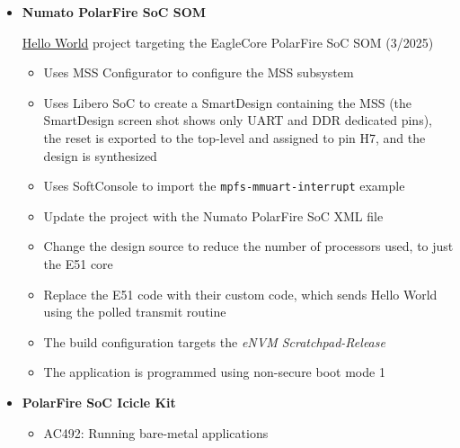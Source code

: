 \begin{itemize}
\begin{itemize}
{Gareth Halfacree - Hands-On with the Low-Cost Microchip PolarFire SoC Discovery Kit}
\begin{itemize}
\item
This article summarizes the Discovery Kit hardware and software features.
\item
Gareth has another series of articles on the
\href{https://www.hackster.io/news/hackster-s-fpgadventures-unboxing-and-testing-the-microchip-polarfire-soc-icicle-kit-9f194a9639f6}
{PolarFire SoC Icicle Kit} (there are links to the whole series at the end of the first article).
\item Starware
\end{itemize}
%
\end{itemize}

\item \textbf{Numato PolarFire SoC SOM}

\href{https://numato.com/kb/hello-world-project-on-eaglecore-polarfire-soc-som}
{Hello World} project targeting the EagleCore PolarFire SoC SOM (3/2025)
%
\begin{itemize}
\item Uses MSS Configurator to configure the MSS subsystem
\item Uses Libero SoC to create a SmartDesign containing the MSS\newline
(the SmartDesign screen shot shows only UART and DDR dedicated pins), the
reset is exported to the top-level and assigned to pin H7, and the
design is synthesized
\item Uses SoftConsole to import the \verb+mpfs-mmuart-interrupt+ example
\item Update the project with the Numato PolarFire SoC XML file
\item Change the design source to reduce the number of processors used, to just the E51 core
\item Replace the E51 code with their custom code, which sends Hello World
using the polled transmit routine
\item The build configuration targets the \emph{eNVM Scratchpad-Release}
\item The application is programmed using non-secure boot mode 1
\end{itemize}

\newpage
\item \textbf{PolarFire SoC Icicle Kit}
%
\begin{itemize}
%
\item AC492: Running bare-metal applications~\cite{Microchip_AC492_2020}


\end{itemize}
\end{itemize}
